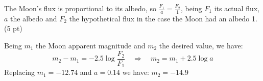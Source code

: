 The Moon's flux is proportional to its albedo, so $\frac{F_1}{a} = \frac{F_2}{1}$,
being $F_1$ its actual flux, $a$ the albedo and $F_2$ the hypothetical flux in
the case the Moon had an albedo 1. \hfill(5 pt)

Being $m_1$ the Moon apparent magnitude and $m_2$ the desired value, we have:
\begin{equation*}
m_2 - m_1 = -2.5\log\frac{F_2}{F_1}
\quad\Rightarrow\quad
m_2 = m_1 + 2.5\log a \tag*{(5 pt)}
\end{equation*}
Replacing $m_1 = -12.74$ and $a = 0.14$ we have: $m_2 = \mathbf{-14.9}$
